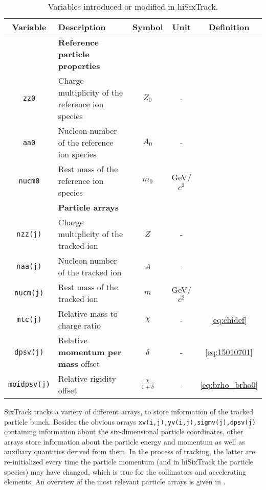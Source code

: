 \begin{table}[b]
\centering
\caption{Variables introduced or modified in hiSixTrack.}
\label{tab:hisixtrack_variables}
\begin{tabular}{clccc}
\toprule
Variable             & Description           & Symbol & Unit & Definition\\ \midrule
 & \textbf{Reference particle properties} \\ \midrule
\texttt{zz0}           &  Charge multiplicity of the reference ion species    & $Z_0$     & - &       \\
\texttt{aa0}           &  Nucleon number of the reference ion species         & $A_0$     & - &       \\
\texttt{nucm0}         &  Rest mass of the reference ion species              & $m_0$     & GeV/$c^2$ &       \\ \midrule
 & \textbf{Particle arrays} \\ \midrule
\texttt{nzz(j)}        &  Charge multiplicity of the tracked ion              & $Z$       & - &       \\
\texttt{naa(j)}        &  Nucleon number of the tracked ion                   & $A$       & - &       \\
\texttt{nucm(j)}       &  Rest mass of the tracked ion                        & $m$       & GeV/$c^2$ & \\
\texttt{mtc(j)}        &  Relative mass to charge ratio                       & $\chi$    & - & \eqref{eq:chidef}      \\
\texttt{dpsv(j)}       &  Relative \textbf{momentum per mass} offset          & $\delta$  & -    & \eqref{eq:15010701}     \\
\texttt{moidpsv(j)}    &  Relative rigidity offset  & $\frac{\chi}{1+\delta}$    & - &   \eqref{eq:brho_brho0}   \\ \bottomrule
\end{tabular}
\end{table}

SixTrack tracks a variety of different arrays, to store information of the tracked particle bunch. Besides the obvious arrays \lstinline{xv(i,j),yv(i,j),sigmv(j),dpsv(j)} containing information about the six-dimensional particle coordinates, other arrays store information about the particle energy and momentum as well as auxiliary quantities derived from them. In the process of tracking, the latter are re-initialized every time the particle momentum (and in hiSixTrack the particle species) may have changed, which is true for the collimators and accelerating elements. An overview of the most relevant particle arrays is given in .


